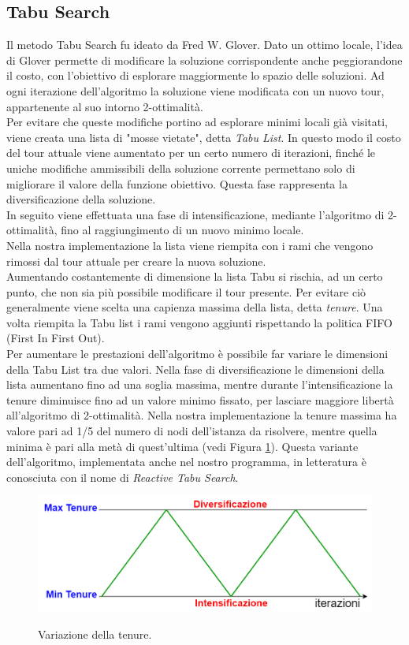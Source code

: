 \subsection{Tabu Search}
Il metodo Tabu Search fu ideato da Fred W. Glover. Dato un ottimo locale, l'idea di Glover permette di modificare la soluzione corrispondente anche peggiorandone il costo, con l'obiettivo di esplorare maggiormente lo spazio delle soluzioni. Ad ogni iterazione dell'algoritmo la soluzione viene modificata con un nuovo tour, appartenente al suo intorno 2-ottimalità.\\
Per evitare che queste modifiche portino ad esplorare minimi locali già visitati, viene creata una lista di "mosse vietate", detta \textit{Tabu List}. In questo modo il costo del tour attuale viene aumentato per un certo numero di iterazioni, finché le uniche modifiche ammissibili della soluzione corrente permettano solo di migliorare il valore della funzione obiettivo. Questa fase rappresenta la diversificazione della soluzione.\\
In seguito viene effettuata una fase di intensificazione, mediante l'algoritmo di 2-ottimalità, fino al raggiungimento di un nuovo minimo locale.\\
Nella nostra implementazione la lista viene riempita con i rami che vengono rimossi dal tour attuale per creare la nuova soluzione.\\
Aumentando costantemente di dimensione la lista Tabu si rischia, ad un certo punto, che non sia più possibile modificare il tour presente. Per evitare ciò generalmente viene scelta una capienza massima della lista, detta \textit{tenure}. Una volta riempita la Tabu list i rami vengono aggiunti rispettando la politica FIFO (First In First Out).\\
Per aumentare le prestazioni dell'algoritmo è possibile far variare le dimensioni della Tabu List tra due valori. Nella fase di diversificazione le dimensioni della lista aumentano fino ad una soglia massima, mentre durante l'intensificazione la tenure diminuisce fino ad un valore minimo fissato, per lasciare maggiore libertà all'algoritmo di 2-ottimalità. Nella nostra implementazione la tenure massima ha valore pari ad 1/5 del numero di nodi dell'istanza da risolvere, mentre quella minima è pari alla metà di quest'ultima (vedi Figura \ref{tenure}). Questa variante dell'algoritmo, implementata anche nel nostro programma, in letteratura è conosciuta con il nome di \textit{Reactive Tabu Search}.
 \begin{figure}[H] 
\begin{center} 
  \includegraphics[scale=0.35]{Images/tenure}\\ 
  \caption{\footnotesize{Variazione della tenure.}}
  \label{tenure}
\end{center}
\end{figure}
